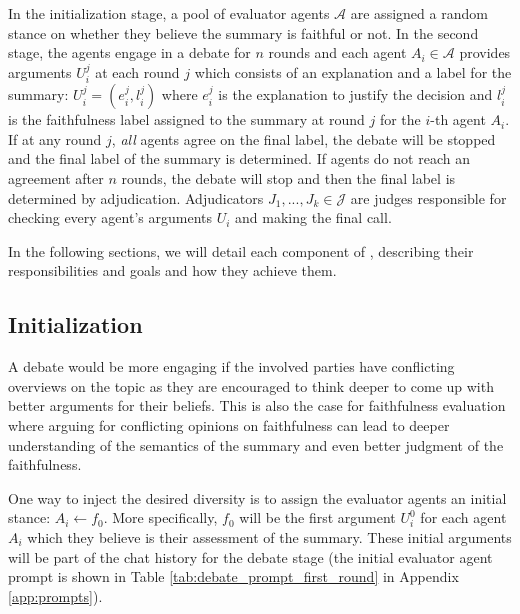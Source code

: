 In the initialization stage, a pool of evaluator agents $\mathcal{A}$ are assigned a random stance on whether they believe the summary is faithful or not. 
In the second stage, the agents engage in a debate for $n$ rounds and each agent $A_i \in \mathcal{A}$ provides arguments $U^j_i$ at each round $j$ which consists of an explanation and a label for the summary: $U^j_i = (e^j_i, l^j_i)$ where $e^j_i$ is the explanation to justify the decision and $l^j_i$ is the faithfulness label assigned to the summary at round $j$ for the $i$-th agent $A_i$. If at any round $j$, {\em all} agents agree on the final label, the debate will be stopped and the final label of the summary is determined.
If agents do not reach an agreement after $n$ rounds, the debate will stop and then the final label is determined by adjudication. Adjudicators $J_1, ..., J_k \in \mathcal{J}$ are judges responsible for checking every agent’s arguments $U_i$ and making the final call. 

In the following sections, we will detail each component of \method, describing their responsibilities and goals and how they achieve them. 

\subsection{Initialization}
A debate would be more engaging if the involved parties have conflicting overviews on the topic as they are encouraged to think deeper to come up with better arguments for their beliefs. 
This is also the case for faithfulness evaluation where arguing for conflicting opinions on faithfulness can lead to deeper understanding of the semantics of the summary and even better judgment of the faithfulness. 

One way to inject the desired diversity is to assign the evaluator agents an initial stance: $A_i \leftarrow{f_0}$. More specifically, $f_0$ will be the first argument $U^0_i$ for each agent $A_i$ which they believe is their assessment of the summary. These initial arguments will be part of the chat history for the debate stage (the initial evaluator agent prompt is shown in Table \ref{tab:debate_prompt_first_round} in Appendix \ref{app:prompts}).

